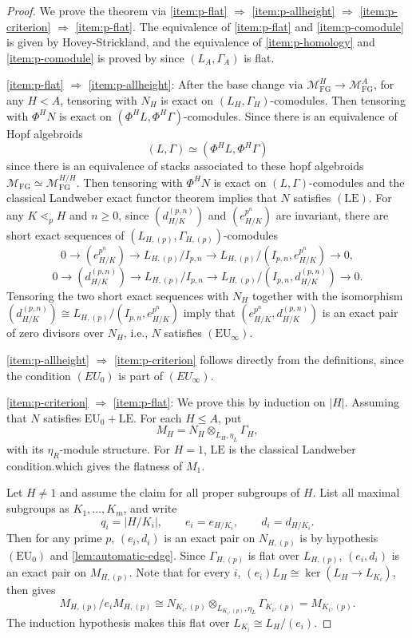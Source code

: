 \documentclass[11pt,reqno]{amsart}
\newcommand{\MFG}{\mathcal M_{\mathrm{FG}}}
\newcommand{\tensor}{\otimes}
\begin{document}
\begin{proof}
  We prove the theorem via \ref{item:p-flat} $\Longrightarrow$ \ref{item:p-allheight} $\Longrightarrow$ \ref{item:p-criterion} $\Longrightarrow$ \ref{item:p-flat}. The equivalence of \ref{item:p-flat} and \ref{item:p-comodule} is given by Hovey-Strickland\cite[Lemma 2.2]{hovey2005comodules}, and the equivalence of \ref{item:p-homology} and \ref{item:p-comodule} is proved by  since $(L_A, \Gamma_A)$ is flat.

  \ref{item:p-flat} $\Longrightarrow$ \ref{item:p-allheight}: After the base change via $\MFG^H \to \MFG^A$, for any $H<A$, tensoring with $N_H$ is exact on $(L_{H},\Gamma_{H})$-comodules. Then tensoring with $\Phi^H N$ is exact on $(\Phi^H L, \Phi^H \Gamma)$-comodules. Since there is an equivalence of Hopf algebroids 
  \[
  (L, \Gamma) \simeq (\Phi^H L, \Phi^H \Gamma)
  \]
  since there is an equivalence of stacks associated to these hopf algebroids $\MFG \simeq \MFG^{H/H}$. Then tensoring with $\Phi^H N$ is exact on $(L, \Gamma)$-comodules and the classical Landweber exact functor theorem implies that $N$ satisfies $(\mathrm{LE})$. For any $K\lessdot_p H$ and $n\geq 0$, since $(d_{H/K}^{(p,n)})$ and $(e_{H/K}^{p^n})$ are invariant, there are short exact sequences of $(L_{H,(p)},\Gamma_{H,(p)})$-comodules
  \[
  0\to (e_{H/K}^{p^n}) \to L_{H,(p)}/I_{p,n} \to L_{H,(p)}/(I_{p,n},e_{H/K}^{p^n}) \to 0,
  \] 
  \[
  0 \to (d_{H/K}^{(p,n)}) \to L_{H,(p)}/I_{p,n}\to L_{H,(p)}/(I_{p,n},d_{H/K}^{(p,n)})\to 0.
  \]
  Tensoring the two short exact sequences with $N_H$ together with the isomorphism $(d_{H/K}^{(p,n)}) \cong L_{H,(p)}/(I_{p,n},e_{H/K}^{p^n})$ imply that $(e_{H/K}^{p^n},d_{H/K}^{(p,n)})$ is an exact pair of zero divisors over $N_H$, i.e., $N$ satisfies $(\mathrm{EU}_\infty)$.

  \ref{item:p-allheight} $\Longrightarrow$ \ref{item:p-criterion} follows directly from the definitions, since the condition $(EU_0)$ is part of $(EU_\infty)$.

  \ref{item:p-criterion} $\Longrightarrow$ \ref{item:p-flat}: We prove this by induction on $|H|$. Assuming that $N$ satisfies $\mathrm{EU}_{0}+\mathrm{LE}$. For each $H\leq A$, put
  \[
  M_H=N_H\tensor_{L_{H},\eta_L}\Gamma_{H},
  \]
  with its $\eta_R$-module structure.  For $H=1$, $\mathrm{LE}$ is the classical Landweber condition.which gives the flatness of $M_1$.

  Let $H\neq 1$ and assume the claim for all proper subgroups of $H$.  List all maximal subgroups as $K_1,\ldots,K_m$, and write
  \[
  q_i=|H/K_i|, \qquad e_i=e_{H/K_i}, \qquad d_i=d_{H/K_i}.
  \]
  Then for any prime $p$, $(e_i,d_i)$ is an exact pair on $N_{H,(p)}$ is by hypothesis $(\mathrm{EU}_{0})$ and \cref{lem:automatic-edge}.  Since $\Gamma_{H,(p)}$ is flat over $L_{H,(p)}$, $(e_i,d_i)$ is an exact pair on $M_{H,(p)}$. Note that for every $i$, $(e_i)L_H \cong \ker(L_H\to L_{K_i})$, then  gives 
  \[ 
  M_{H,(p)}/e_iM_{H,(p)}\cong N_{K_i,(p)}\tensor_{L_{K_i,(p)},\eta_L}\Gamma_{K_i,(p)} =M_{K_i,(p)}.
  \]
  The induction hypothesis makes this flat over $L_{K_i}\cong L_{H}/(e_i)$.


\end{proof}
\end{document}
